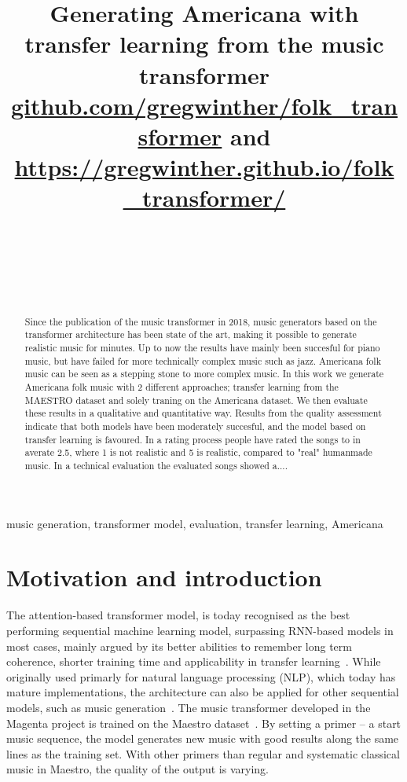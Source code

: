\documentclass{IEEEtran}
\title{Generating Americana with transfer learning from the music transformer \\
    \normalsize{\url{github.com/gregwinther/folk_transformer} and \url{https://gregwinther.github.io/folk_transformer/}}}
\author{\IEEEauthorblockN{Sebastian G. Winther-Larsen} \\
\IEEEauthorblockA{\textit{Center for Computing in Science Education,
    Department of Physics, University of Oslo} \\
}
\and
\IEEEauthorblockN{Tom F. Hansen} \\
\IEEEauthorblockA{\textit{Institute of Informatics, University of Oslo} \\
}
\and
\IEEEauthorblockN{Bjørn Iversen} \\
\IEEEauthorblockA{\textit{Institute of Informatics, University of Oslo} \\
}
}
\begin{document}
    \maketitle

    \begin{abstract}
        Since the publication of the music transformer in 2018, music generators based on
        the transformer architecture has been state of the art, making it possible to generate
        realistic music for minutes. Up to now the results have mainly been succesful for piano music, but
        have failed for more technically complex music such as jazz. Americana folk music can be seen as
        a stepping stone to more complex music. In this work we generate Americana folk music with 2 different approaches; transfer learning from the MAESTRO dataset and solely traning on the Americana dataset. We then evaluate these results in a qualitative and quantitative way. Results from the 
        quality assessment indicate that both models have been moderately succesful, and the model based on transfer learning is favoured. In a rating process people have rated the songs to in averate 2.5,
         where 1 is not realistic and 5 is realistic, compared to "real" humanmade music. In a technical 
         evaluation the evaluated songs showed a....
        \end{abstract}
        
        \begin{IEEEkeywords}
        music generation, transformer model, evaluation, transfer learning, Americana
        \end{IEEEkeywords}

    \section{Motivation and introduction}

        The attention-based transformer model,
        is today recognised as the best performing sequential machine learning model,
        surpassing RNN-based models in most cases, mainly argued by its better abilities
        to remember long term coherence, shorter training time and applicability in transfer
        learning~\cite{vaswani2017attention}.
        While originally used primarly for
        natural language processing (NLP), which today has mature implementations,
        the architecture can also be applied for other sequential models,
        such as music generation~\cite{huang2018music}.
        The music transformer developed in the Magenta project is trained on the Maestro
        dataset~\cite{maestrodataset}.
        By setting a primer – a start music sequence, the model generates new music with good
        results along the same lines as the training set. With other primers than regular and
        systematic classical music in Maestro, the quality of the output is varying.
        
\end{document}
